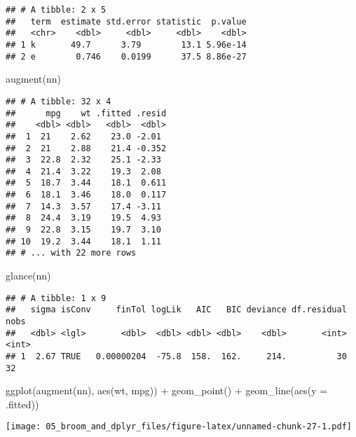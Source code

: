 \documentclass[
]{book}
\newenvironment{Shaded}{\begin{snugshade}}{\end{snugshade}}
\newcommand{\AttributeTok}[1]{\textcolor[rgb]{0.77,0.63,0.00}{#1}}
\newcommand{\FunctionTok}[1]{\textcolor[rgb]{0.00,0.00,0.00}{#1}}
\newcommand{\NormalTok}[1]{#1}
\newcommand{\SpecialCharTok}[1]{\textcolor[rgb]{0.00,0.00,0.00}{#1}}
\begin{document}
\begin{verbatim}
## # A tibble: 2 x 5
##   term  estimate std.error statistic  p.value
##   <chr>    <dbl>     <dbl>     <dbl>    <dbl>
## 1 k       49.7      3.79        13.1 5.96e-14
## 2 e        0.746    0.0199      37.5 8.86e-27
\end{verbatim}

\begin{Shaded}
\begin{Highlighting}[]
\FunctionTok{augment}\NormalTok{(nn)}
\end{Highlighting}
\end{Shaded}

\begin{verbatim}
## # A tibble: 32 x 4
##      mpg    wt .fitted .resid
##    <dbl> <dbl>   <dbl>  <dbl>
##  1  21    2.62    23.0 -2.01 
##  2  21    2.88    21.4 -0.352
##  3  22.8  2.32    25.1 -2.33 
##  4  21.4  3.22    19.3  2.08 
##  5  18.7  3.44    18.1  0.611
##  6  18.1  3.46    18.0  0.117
##  7  14.3  3.57    17.4 -3.11 
##  8  24.4  3.19    19.5  4.93 
##  9  22.8  3.15    19.7  3.10 
## 10  19.2  3.44    18.1  1.11 
## # ... with 22 more rows
\end{verbatim}

\begin{Shaded}
\begin{Highlighting}[]
\FunctionTok{glance}\NormalTok{(nn)}
\end{Highlighting}
\end{Shaded}

\begin{verbatim}
## # A tibble: 1 x 9
##   sigma isConv     finTol logLik   AIC   BIC deviance df.residual  nobs
##   <dbl> <lgl>       <dbl>  <dbl> <dbl> <dbl>    <dbl>       <int> <int>
## 1  2.67 TRUE   0.00000204  -75.8  158.  162.     214.          30    32
\end{verbatim}

\begin{Shaded}
\begin{Highlighting}[]
\FunctionTok{ggplot}\NormalTok{(}\FunctionTok{augment}\NormalTok{(nn), }\FunctionTok{aes}\NormalTok{(wt, mpg)) }\SpecialCharTok{+}
  \FunctionTok{geom\_point}\NormalTok{() }\SpecialCharTok{+}
  \FunctionTok{geom\_line}\NormalTok{(}\FunctionTok{aes}\NormalTok{(}\AttributeTok{y =}\NormalTok{ .fitted))}
\end{Highlighting}
\end{Shaded}

\texttt{[image: 05\_broom\_and\_dplyr\_files/figure-latex/unnamed-chunk-27-1.pdf]}
\end{document}
